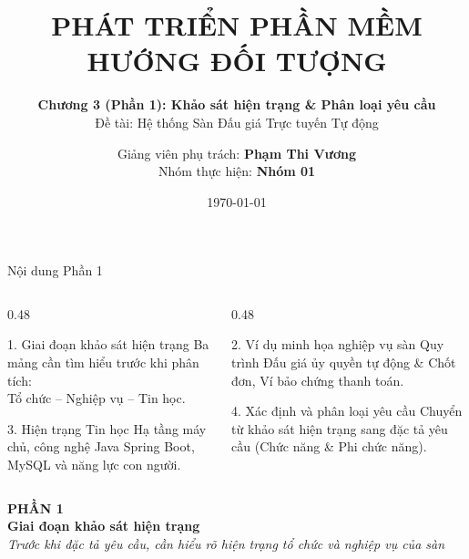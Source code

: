 \documentclass[aspectratio=169, 10pt]{beamer}
\title[Khảo sát hiện trạng - Hệ thống Đấu giá]{\textbf{PHÁT TRIỂN PHẦN MỀM HƯỚNG ĐỐI TƯỢNG}}
\subtitle{\textbf{Chương 3 (Phần 1): Khảo sát hiện trạng \& Phân loại yêu cầu}\\\small Đề tài: Hệ thống Sàn Đấu giá Trực tuyến Tự động}
\author[Nhóm 01]{Giảng viên phụ trách: \textbf{Phạm Thi Vương}\\Nhóm thực hiện: \textbf{Nhóm 01}}
\institute[OOAD]{Học phần: Phát Triển Phần Mềm Hướng Đối Tượng (OOAD)}
\date{\today}
\begin{document}
\begin{frame}
    \titlepage
\end{frame}

\begin{frame}{Nội dung Phần 1}
    \begin{columns}[t]
        \begin{column}{0.48\textwidth}
            \begin{block}{1. Giai đoạn khảo sát hiện trạng}
                Ba mảng cần tìm hiểu trước khi phân tích:\\
                Tổ chức -- Nghiệp vụ -- Tin học.
            \end{block}
            \vspace{0.3cm}
            \begin{block}{3. Hiện trạng Tin học}
                Hạ tầng máy chủ, công nghệ Java Spring Boot, MySQL và năng lực con người.
            \end{block}
        \end{column}
        
        \begin{column}{0.48\textwidth}
            \begin{block}{2. Ví dụ minh họa nghiệp vụ sàn}
                Quy trình Đấu giá ủy quyền tự động \& Chốt đơn, Ví bảo chứng thanh toán.
            \end{block}
            \vspace{0.3cm}
            \begin{block}{4. Xác định và phân loại yêu cầu}
                Chuyển từ khảo sát hiện trạng sang đặc tả yêu cầu (Chức năng \& Phi chức năng).
            \end{block}
        \end{column}
    \end{columns}
\end{frame}

\begin{frame}
    \begin{center}
        \vspace{1.5cm}
        {\Large \textbf{\color{primaryNavy}PHẦN 1}}\\[0.5cm]
        {\huge \textbf{\color{primaryNavy}Giai đoạn khảo sát hiện trạng}}\\[0.6cm]
        \textit{\color{secondarySlate}Trước khi đặc tả yêu cầu, cần hiểu rõ hiện trạng tổ chức và nghiệp vụ của sàn}
    \end{center}
\end{frame}
\end{document}
